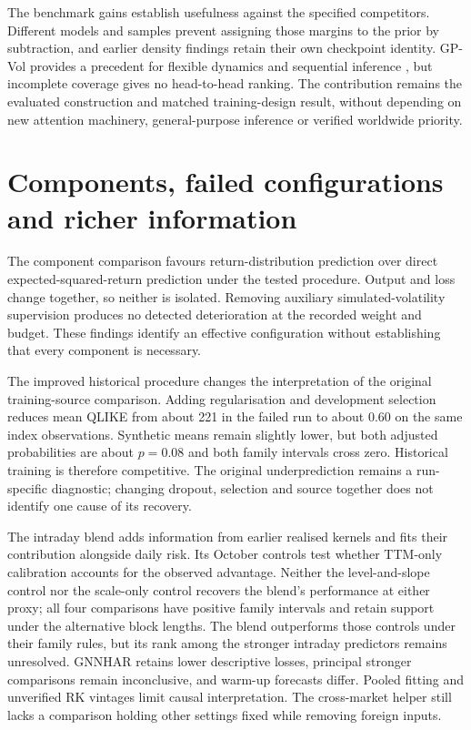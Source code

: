 The benchmark gains establish usefulness against the specified competitors. Different models and samples prevent assigning those margins to the prior by subtraction, and earlier density findings retain their own checkpoint identity. GP-Vol provides a precedent for flexible dynamics and sequential inference \citep{wu2014gaussian}, but incomplete coverage gives no head-to-head ranking. The contribution remains the evaluated construction and matched training-design result, without depending on new attention machinery, general-purpose inference or verified worldwide priority.

\section{Components, failed configurations and richer information}

The component comparison favours return-distribution prediction over direct expected-squared-return prediction under the tested procedure. Output and loss change together, so neither is isolated. Removing auxiliary simulated-volatility supervision produces no detected deterioration at the recorded weight and budget. These findings identify an effective configuration without establishing that every component is necessary.

The improved historical procedure changes the interpretation of the original training-source comparison. Adding regularisation and development selection reduces mean QLIKE from about 221 in the failed run to about 0.60 on the same index observations. Synthetic means remain slightly lower, but both adjusted probabilities are about $p=0.08$ and both family intervals cross zero. Historical training is therefore competitive. The original underprediction remains a run-specific diagnostic; changing dropout, selection and source together does not identify one cause of its recovery.

The intraday blend adds information from earlier realised kernels and fits their contribution alongside daily risk. Its October controls test whether TTM-only calibration accounts for the observed advantage. Neither the level-and-slope control nor the scale-only control recovers the blend's performance at either proxy; all four comparisons have positive family intervals and retain support under the alternative block lengths. The blend outperforms those controls under their family rules, but its rank among the stronger intraday predictors remains unresolved. GNNHAR retains lower descriptive losses, principal stronger comparisons remain inconclusive, and warm-up forecasts differ. Pooled fitting and unverified RK vintages limit causal interpretation. The cross-market helper still lacks a comparison holding other settings fixed while removing foreign inputs.

